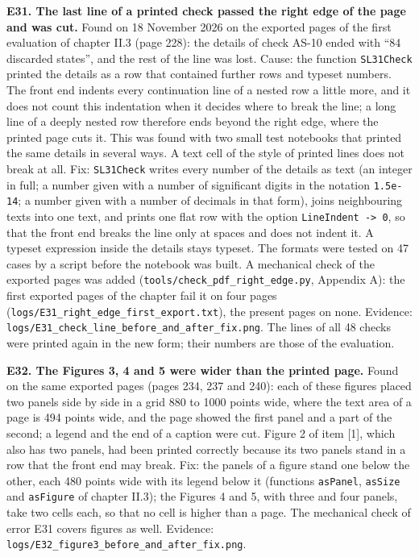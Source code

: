 \documentclass[
  10pt,
]{article}
\begin{document}
\textbf{E31. The last line of a printed check passed the right edge of
the page and was cut.} Found on 18 November 2026 on the exported pages
of the first evaluation of chapter II.3 (page 228): the details of check
AS-10 ended with ``84 discarded states'', and the rest of the line was
lost. Cause: the function \texttt{SL31Check} printed the details as a
row that contained further rows and typeset numbers. The front end
indents every continuation line of a nested row a little more, and it
does not count this indentation when it decides where to break the line;
a long line of a deeply nested row therefore ends beyond the right edge,
where the printed page cuts it. This was found with two small test
notebooks that printed the same details in several ways. A text cell of
the style of printed lines does not break at all. Fix:
\texttt{SL31Check} writes every number of the details as text (an
integer in full; a number given with a number of significant digits in
the notation \texttt{1.5e-14}; a number given with a number of decimals
in that form), joins neighbouring texts into one text, and prints one
flat row with the option \texttt{LineIndent\ -\textgreater{}\ 0}, so
that the front end breaks the line only at spaces and does not indent
it. A typeset expression inside the details stays typeset. The formats
were tested on 47 cases by a script before the notebook was built. A
mechanical check of the exported pages was added
(\texttt{tools/check\_pdf\_right\_edge.py}, Appendix A): the first
exported pages of the chapter fail it on four pages
(\texttt{logs/E31\_right\_edge\_first\_export.txt}), the present pages
on none. Evidence:
\texttt{logs/E31\_check\_line\_before\_and\_after\_fix.png}. The lines
of all 48 checks were printed again in the new form; their numbers are
those of the evaluation.

\textbf{E32. The Figures 3, 4 and 5 were wider than the printed page.}
Found on the same exported pages (pages 234, 237 and 240): each of these
figures placed two panels side by side in a grid 880 to 1000 points
wide, where the text area of a page is 494 points wide, and the page
showed the first panel and a part of the second; a legend and the end of
a caption were cut. Figure 2 of item {[}1{]}, which also has two panels,
had been printed correctly because its two panels stand in a row that
the front end may break. Fix: the panels of a figure stand one below the
other, each 480 points wide with its legend below it (functions
\texttt{asPanel}, \texttt{asSize} and \texttt{asFigure} of chapter
II.3); the Figures 4 and 5, with three and four panels, take two cells
each, so that no cell is higher than a page. The mechanical check of
error E31 covers figures as well. Evidence:
\texttt{logs/E32\_figure3\_before\_and\_after\_fix.png}.
\end{document}
